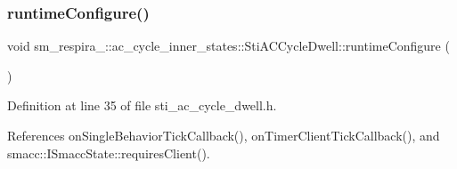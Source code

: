 \subsubsection{\texorpdfstring{runtime\+Configure()}{runtimeConfigure()}}
{\footnotesize\ttfamily void sm\+\_\+respira\+\_\+::ac\+\_\+cycle\+\_\+inner\+\_\+states\+::\+Sti\+A\+C\+Cycle\+Dwell\+::runtime\+Configure (\begin{DoxyParamCaption}{ }\end{DoxyParamCaption})\hspace{0.3cm}{\ttfamily [inline]}}



Definition at line 35 of file sti\+\_\+ac\+\_\+cycle\+\_\+dwell.\+h.



References on\+Single\+Behavior\+Tick\+Callback(), on\+Timer\+Client\+Tick\+Callback(), and smacc\+::\+I\+Smacc\+State\+::requires\+Client().


